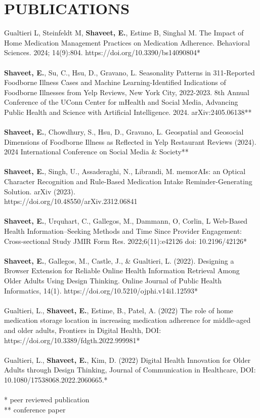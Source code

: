 \documentclass[a4paper,12pt]{article}
\begin{document}
{\section*{PUBLICATIONS}
Gualtieri L, Steinfeldt M, \textbf{Shaveet, E.}, Estime B, Singhal M. The Impact of Home Medication Management Practices on Medication Adherence. Behavioral Sciences. 2024; 14(9):804. https://doi.org/10.3390/bs14090804*\\
\\
\textbf{Shaveet, E.}, Su, C., Hsu, D., Gravano, L. Seasonality Patterns in 311-Reported Foodborne Illness Cases and Machine Learning-Identified Indications of Foodborne Illnesses from Yelp Reviews, New York City, 2022-2023. 8th Annual Conference of the UConn Center for mHealth and Social Media, Advancing Public Health and Science with Artificial Intelligence. 2024. arXiv:2405.06138**\\
\\
\textbf{Shaveet, E.}, Chowdhury, S., Hsu, D., Gravano, L. Geospatial and Geosocial Dimensions of Foodborne Illness as Reflected in Yelp Restaurant Reviews (2024). 2024 International Conference on Social Media \& Society**\\
\\
\textbf{Shaveet, E.}, Singh, U., Assaderaghi, N., Librandi, M. memorAIs: an Optical Character Recognition and Rule-Based Medication Intake Reminder-Generating Solution. arXiv (2023). \\https://doi.org/10.48550/arXiv.2312.06841\\
\\
\textbf{Shaveet, E.}, Urquhart, C., Gallegos, M., Dammann, O, Corlin, L Web-Based Health Information–Seeking Methods and Time Since Provider Engagement: Cross-sectional Study JMIR Form Res. 2022;6(11):e42126 doi: 10.2196/42126*\\
\\
\textbf{Shaveet, E.}, Gallegos, M., Castle, J., \& Gualtieri, L. (2022). Designing a Browser Extension for Reliable Online Health Information Retrieval Among Older Adults Using Design Thinking. Online Journal of Public Health Informatics, 14(1). https://doi.org/10.5210/ojphi.v14i1.12593*\\
\\
Gualtieri, L., \textbf{Shaveet, E.}, Estime, B., Patel, A. (2022) The role of home medication storage location in increasing medication adherence for middle-aged and older adults, Frontiers in Digital Health, DOI: https://doi.org/10.3389/fdgth.2022.999981*\\
\\
Gualtieri, L., \textbf{Shaveet, E.}, Kim, D. (2022) Digital Health Innovation for Older Adults through Design Thinking, Journal of Communication in Healthcare, DOI: 10.1080/17538068.2022.2060665.*\\
\\
\footnotesize{* peer reviewed publication}\\
\footnotesize{** conference paper}\\
}
\end{document}
